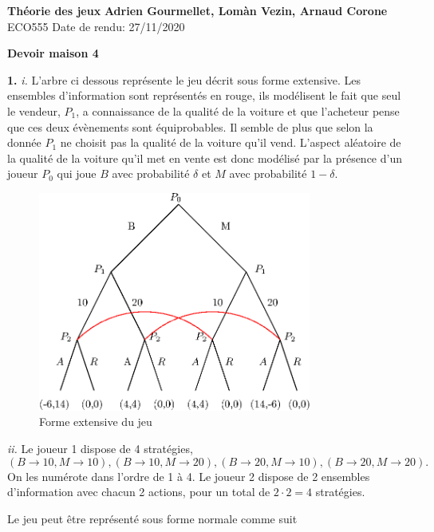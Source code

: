 \documentclass[12pt]{article}
\begin{document}
        \noindent
\textbf{Théorie des jeux} \hfill \textbf{Adrien Gourmellet, Lomàn Vezin, Arnaud Corone}\\
\normalsize ECO555 \hfill Date de rendu: 27/11/2020\\

\begin{center}
\textbf{Devoir maison 4}
\end{center}

\textbf{1.} \textit{i.} L'arbre ci dessous représente le jeu décrit sous forme extensive. Les ensembles d'information sont représentés en rouge, ils modélisent le fait que seul le vendeur, $P_{1}$, a connaissance de la qualité de la voiture et que l'acheteur pense que ces deux évènements sont équiprobables. Il semble de plus que selon la donnée $P_{1}$ ne choisit pas la qualité de la voiture qu'il vend. L'aspect aléatoire de la qualité de la voiture qu'il met en vente est donc modélisé par la présence d'un joueur $P_{0}$ qui joue $B$ avec probabilité $\delta$ et $M$ avec probabilité $1-\delta$.
\begin{figure}[htpb]
        \centering
        \includegraphics[width=0.8\textwidth]{ext1_2.eps}
        \caption{Forme extensive du jeu}
        \label{fig:ext1}
\end{figure}

\medskip

\textit{ii.} Le joueur 1 dispose de 4 stratégies, \[
(B \to 10, M  \to 10), (B \to 10, M \to 20), (B \to 20, M \to 10), (B \to 20, M \to 20)
.\] On les numérote dans l'ordre de 1 à 4. Le joueur 2 dispose de 2 ensembles d'information avec chacun 2 actions, pour un total de $2\cdot 2 = 4$ stratégies.

Le jeu peut être représenté sous forme normale comme suit
\medskip 
\end{document}
